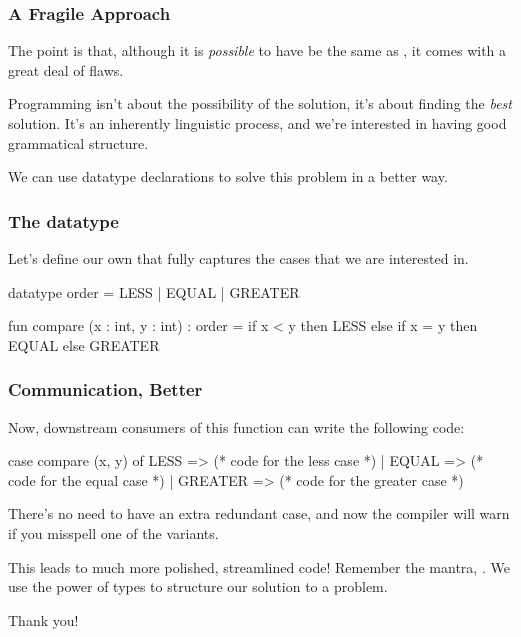 \documentclass[aspectratio=169]{beamer}
\begin{document}
\begin{frame}[fragile]
  \frametitle{A Fragile Approach}

  The point is that, although it is \textit{possible} to have  be the
  same as , it comes with a great deal of flaws.

  \vspace{\fill}

  Programming isn't about the possibility of the solution, it's about finding the
  \textit{best} solution. It's an inherently linguistic process, and we're interested
  in having good grammatical structure.

  \vspace{\fill}

  We can use datatype declarations to solve this problem in a better way.
\end{frame}

\begin{frame}[fragile]
  \frametitle{The  datatype}

  Let's define our own  that fully captures the cases that
  we are interested in.

  \vspace{\fill}

  \begin{codeblock}
    datatype order = LESS | EQUAL | GREATER

    fun compare (x : int, y : int) : order = 
      if x < y then
        LESS
      else if x = y then
        EQUAL 
      else
        GREATER 
  \end{codeblock}
\end{frame}

\begin{frame}[fragile]
  \frametitle{Communication, Better}

  Now, downstream consumers of this function can write the following code:

  \vspace{\fill}

  \begin{codeblock}
    case compare (x, y) of
      LESS => (* code for the less case *)
    | EQUAL => (* code for the equal case *) 
    | GREATER => (* code for the greater case *)
  \end{codeblock}

  \vspace{\fill}

  There's no need to have an extra redundant case, and now the compiler will
  warn if you misspell one of the variants.

  \vspace{\fill}

  This leads to much more polished, streamlined code! Remember the mantra,
  . We use the power of types to structure our
  solution to a problem.
\end{frame}


\begin{frame}[plain]
	\begin{center} Thank you! \end{center}
\end{frame}
\end{document}
